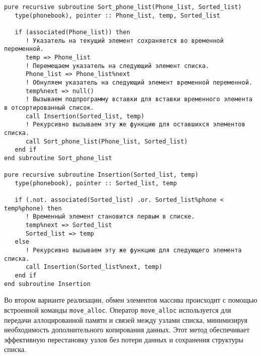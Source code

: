 \documentclass[a4paper,14pt]{article}
\begin{document}
\begin{lstlisting}[caption={Сортировка методом вставок}]
pure recursive subroutine Sort_phone_list(Phone_list, Sorted_list)
   type(phonebook), pointer :: Phone_list, temp, Sorted_list

   if (associated(Phone_list)) then
      ! Указатель на текущий элемент сохраняется во временной переменной.
      temp => Phone_list
      ! Перемещаем указатель на следующий элемент списка.
      Phone_list => Phone_list%next
      ! Обнуляем указатель на следующий элемент временной переменной.
      temp%next => null()
      ! Вызываем подпрограмму вставки для вставки временного элемента в отсортированный список.
      call Insertion(Sorted_list, temp)
      ! Рекурсивно вызываем эту же функцию для оставшихся элементов списка.
      call Sort_phone_list(Phone_list, Sorted_list)
   end if
end subroutine Sort_phone_list

pure recursive subroutine Insertion(Sorted_list, temp)
   type(phonebook), pointer :: Sorted_list, temp

   if (.not. associated(Sorted_list) .or. Sorted_list%phone < temp%phone) then
      ! Временный элемент становится первым в списке.
      temp%next => Sorted_list
      Sorted_list => temp
   else 
      ! Рекурсивно вызываем эту же функцию для следующего элемента списка.
      call Insertion(Sorted_list%next, temp)
   end if
end subroutine Insertion
\end{lstlisting}

Во втором варианте реализации, обмен элементов массива происходит с помощью встроенной команды \texttt{move\_alloc}. Оператор \texttt{move\_alloc} используется для передачи аллоцированной памяти и связей между узлами списка, минимизируя необходимость дополнительного копирования данных. Этот метод обеспечивает эффективную перестановку узлов без потери данных и сохранения структуры списка.
\end{document}
